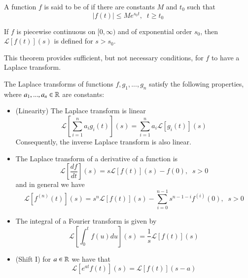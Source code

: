 \documentclass[12pt, a4paper, oneside, openright, titlepage]{book}
\begin{document}
\begin{defn}
    A function $f$ is said to be of  if there are constants $M$ and $t_0$ such that \begin{equation*}
        |f(t)| \leq Me^{s_0t},\;\;t \geq t_0
    \end{equation*}
\end{defn}

\begin{thm}
    If $f$ is piecewise continuous on $[0,\infty)$ and of exponential order $s_0$, then $\mathcal{L}[f(t)](s)$ is defined for $s > s_0$.
\end{thm}

This theorem provides sufficient, but not necessary conditions, for $f$ to have a Laplace transform.

\begin{props}
    The Laplace transforms of functions $f,g_1,...,g_n$ satisfy the following properties, where $a_1,...,a_n \in \mathbb R$ are constants: \begin{itemize}
        \item (Linearity) The Laplace transform is linear \begin{equation}
                \mathcal{L}\left[\sum_{i=1}^na_ig_i(t)\right](s) = \sum_{i=1}^na_i\mathcal{L}[g_i(t)](s)
            \end{equation}
            Consequently, the inverse Laplace transform is also linear.
        \item The Laplace transform of a derivative of a function is \begin{equation}
                \mathcal{L}\left[\frac{df}{dt}\right](s) = s\mathcal{L}[f(t)](s)-f(0),\;\; s > 0
        \end{equation}
            and in general we have \begin{equation}
                \mathcal{L}[f^{(n)}(t)](s) = s^n\mathcal{L}[f(t)](s) - \sum_{i=0}^{n-1}s^{n-1-i}f^{(i)}(0),\;\;s>0
            \end{equation}
        \item The integral of a Fourier transform is given by \begin{equation}
                \mathcal{L}\left[\int_0^tf(u)du\right](s) = \frac{1}{s}\mathcal{L}[f(t)](s)
            \end{equation}
        \item (Shift I) for $a \in \mathbb R$ we have that \begin{equation}
                \mathcal{L}[e^{at}f(t)](s) = \mathcal{L}[f(t)](s-a)

\end{equation}
\end{itemize}
\end{props}
\end{document}
